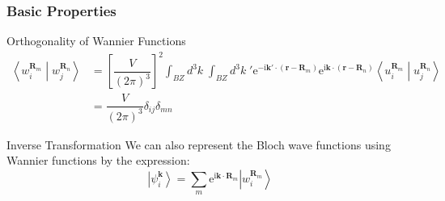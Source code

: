 \documentclass{beamer}
\begin{document}
  \begin{frame}
    \frametitle{Basic Properties}

    \begin{block}{Orthogonality of Wannier Functions}
      \small
      \begin{equation}
        \begin{aligned}
          \left\langle{}w_i^{\mathbf{R}_m}\middle|{}w_j^{\mathbf{R}_n}\right\rangle &= \left[\dfrac{V}{(2\pi)^3}\right]^2\int_{BZ}d^3k\;\int_{BZ}d^3k\;'\mathrm{e}^{-\mathrm{i}\mathbf{k}'\cdot{}(\mathbf{r}-\mathbf{R}_m)}\mathrm{e}^{\mathrm{i}\mathbf{k}\cdot{}(\mathbf{r}-\mathbf{R}_n)}\left\langle{}u_i^{\mathbf{R}_m}\middle|{}u_j^{\mathbf{R}_n}\right\rangle\\
          &= \dfrac{V}{(2\pi)^3}\delta_{ij}\delta_{mn}
        \end{aligned}
      \end{equation}    
    \end{block}

    \begin{block}{Inverse Transformation}
      We can also represent the Bloch wave functions using Wannier functions by the expression:
      \begin{equation}
        \left|\psi_i^{\mathbf{k}}\right\rangle = \sum_m \mathrm{e}^{\mathrm{i}\mathbf{k}\cdot\mathbf{R}_m}\left|w_i^{\mathbf{R}_m}\right\rangle
      \end{equation}    
    \end{block}

    \end{frame}
\end{document}
